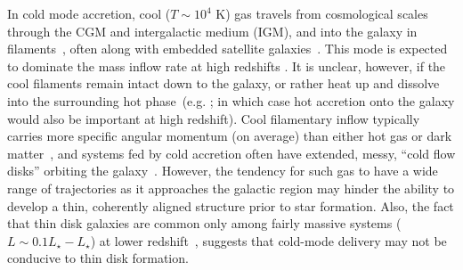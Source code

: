 \documentclass[fleqn,usenatbib]{mnras}
\begin{document}
In cold mode accretion, cool ($T \sim 10^4$ K) gas travels from cosmological scales through the CGM and intergalactic medium (IGM), and into the galaxy in filaments~\cite[e.g.][]{Keres2005, Keres2009, Dekel2006, Faucher-Giguere2011a, Martin2019a}, often along with embedded satellite galaxies~\citep[e.g.][]{Faucher-Giguere2015, Faucher-Giguere2016, Hafen2019, Esmerian2021}.
This mode is expected to dominate the mass inflow rate at high redshifts \citep[$z\gtrsim2$; e.g.][]{Keres2009a, Dekel2009, Huscher2021}.
It is unclear, however, if the cool filaments remain intact down to the galaxy, or rather heat up and dissolve into the surrounding hot phase~(e.g. \citealt{Nelson2016, Mandelker2016, Mandelker2018, Mandelker2020a}; in which case hot accretion onto the galaxy would also be important at high redshift).
Cool filamentary inflow typically carries more specific angular momentum (on average) than either hot gas or dark matter~\citep[e.g.][]{Stewart2017}, and systems fed by cold accretion often have extended, messy, ``cold flow disks'' orbiting the galaxy~\citep[e.g.][]{Stewart2011a, Stewart2013, Danovich2015, Dekel2019}.
However, the tendency for such gas to have a wide range of trajectories as it approaches the galactic region may hinder the ability to develop a thin, coherently aligned structure prior to star formation.
Also, the fact that thin disk galaxies are common only among fairly massive systems ($L \sim 0.1 L_\star - L_\star$) at lower redshift~\citep[e.g.][]{Kranz2003, Kassin2006, Bizyaev2021, Kassin2012a, Simons2015, Simons2017}, suggests that cold-mode delivery may not be conducive to thin disk formation.
\end{document}

